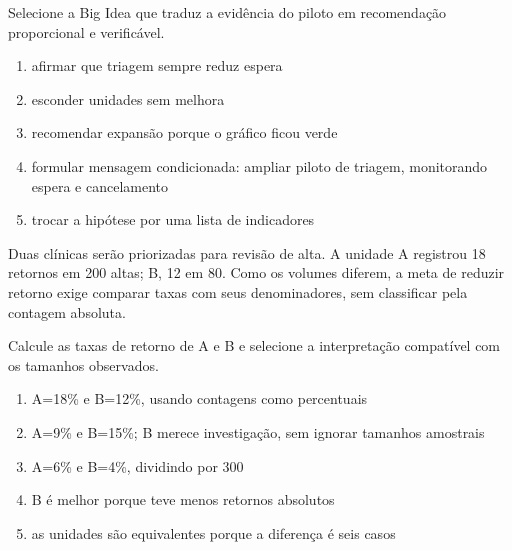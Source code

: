 \Comando Selecione a Big Idea que traduz a evidência do piloto em recomendação proporcional e verificável.

\begin{enumerate}[label=\Alph*)]

\item afirmar que triagem sempre reduz espera

\item esconder unidades sem melhora

\item recomendar expansão porque o gráfico ficou verde

\item formular mensagem condicionada: ampliar piloto de triagem, monitorando espera e cancelamento

\item trocar a hipótese por uma lista de indicadores

\end{enumerate}


\TextoBase

Duas clínicas serão priorizadas para revisão de alta. A unidade A registrou 18 retornos em 200 altas; B, 12 em 80. Como os volumes diferem, a meta de reduzir retorno exige comparar taxas com seus denominadores, sem classificar pela contagem absoluta.

\FonteDidatica

\Comando Calcule as taxas de retorno de A e B e selecione a interpretação compatível com os tamanhos observados.

\begin{enumerate}[label=\Alph*)]

\item A=18\% e B=12\%, usando contagens como percentuais

\item A=9\% e B=15\%; B merece investigação, sem ignorar tamanhos amostrais

\item A=6\% e B=4\%, dividindo por 300

\item B é melhor porque teve menos retornos absolutos

\item as unidades são equivalentes porque a diferença é seis casos

\end{enumerate}

